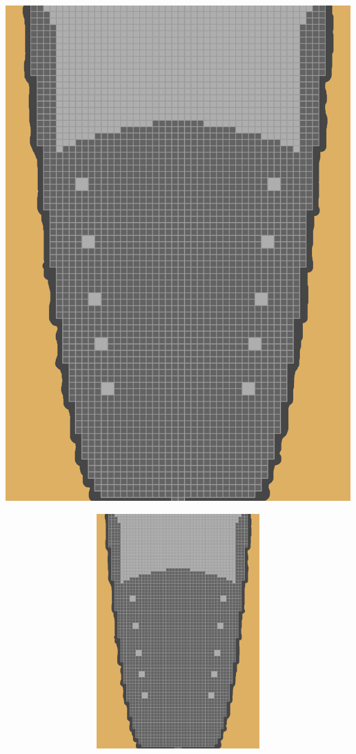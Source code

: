 \documentclass[a4paper, landscape]{article}
\begin{document}
\includegraphics[trim = 862 273 80 1630, clip, height = 19cm, width = 28cm]{Bossroom.png}
\clearpage
	\begin{figure}
\includegraphics[trim = 80 0 860 2204, clip, height = 9cm, width = 28cm]{Bossroom.png}
	\end{figure}
\end{document}
